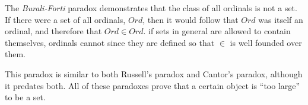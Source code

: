 \documentclass[12pt]{article}
\begin{document}
The \emph{Burali-Forti} paradox demonstrates that the class of all ordinals is not a set.  If there were a set of all ordinals, $Ord$, then it would follow that $Ord$ was itself an ordinal, and therefore that $Ord\in Ord$.   if sets in general are allowed to contain themselves, ordinals cannot since they are defined so that $\in$ is well founded over them.

This paradox is similar to both Russell's paradox and Cantor's paradox, although it predates both.  All of these paradoxes prove that a certain object is ``too large'' to be a set.
\end{document}
